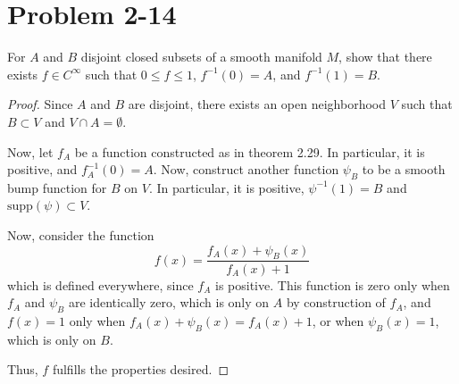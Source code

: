 \documentclass[fontsize=11pt]{scrartcl} %
\numberwithin{equation}{section} %
\numberwithin{figure}{section} %
\numberwithin{table}{section} %
\newcommand{\supp}{\textrm{supp}}
\begin{document}
\pagebreak
\section*{Problem 2-14}
For $A$ and $B$ disjoint closed subsets of a smooth manifold $M$, show that there
exists $f\in C^{\infty}$ such that $0\leq f\leq 1$, $f^{-1}(0) = A$, and $f^{-1}(1) = B$.
\\
\begin{proof}
Since $A$ and $B$ are disjoint, there exists an open neighborhood $V$ such
that $B\subset V$ and $V\cap A=\emptyset$.

Now, let $f_A$ be a function constructed as in theorem 2.29. In particular, it is positive, and
$f_A^{-1}(0) = A$. Now, construct another function $\psi_B$ to be a smooth bump
function for $B$ on $V$. In particular, it is positive, $\psi^{-1}(1) = B$ and $\supp(\psi) \subset V$.

Now, consider the function
\[
f(x) = \frac{f_A(x) + \psi_B(x)}{f_A(x)+1}
\]
which is defined everywhere, since $f_A$ is positive. This function is zero only
when $f_A$ and $\psi_B$ are identically zero, which is only on $A$ by construction of
$f_A$, and $f(x) = 1$ only when $f_A(x) + \psi_B(x) = f_A(x) + 1$, or when $\psi_B(x) = 1$,
which is only on $B$.

Thus, $f$ fulfills the properties desired.
\end{proof}
\pagebreak
\end{document}
